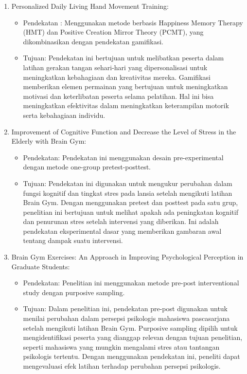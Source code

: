 \documentclass[12pt,a4paper]{article}
\begin{document}
\begin{enumerate}
    \item Personalized Daily Living Hand Movement Training:
    \begin{itemize}
        \item Pendekatan : Menggunakan metode berbasis Happiness Memory Therapy (HMT) dan Positive Creation Mirror Theory (PCMT), yang dikombinasikan dengan pendekatan gamifikasi.

        \item Tujuan: Pendekatan ini bertujuan untuk melibatkan peserta dalam latihan gerakan tangan sehari-hari yang dipersonalisasi untuk meningkatkan kebahagiaan dan kreativitas mereka. Gamifikasi memberikan elemen permainan yang bertujuan untuk meningkatkan motivasi dan keterlibatan peserta selama pelatihan. Hal ini bisa meningkatkan efektivitas dalam meningkatkan keterampilan motorik serta kebahagiaan individu.
    \end{itemize}

    \item Improvement of Cognitive Function and Decrease the Level of Stress in the Elderly with Brain Gym:
    \begin{itemize}
        \item Pendekatan: Pendekatan ini menggunakan desain pre-experimental dengan metode one-group pretest-posttest.
        \item Tujuan: Pendekatan ini digunakan untuk mengukur perubahan dalam fungsi kognitif dan tingkat stres pada lansia setelah mengikuti latihan Brain Gym. Dengan menggunakan pretest dan posttest pada satu grup, penelitian ini bertujuan untuk melihat apakah ada peningkatan kognitif dan penurunan stres setelah intervensi yang diberikan. Ini adalah pendekatan eksperimental dasar yang memberikan gambaran awal tentang dampak suatu intervensi.
    \end{itemize}

    \newpage

    \item Brain Gym Exercises: An Approach in Improving Psychological Perception in Graduate Students:

    \begin{itemize}
        \item Pendekatan: Penelitian ini menggunakan metode pre-post interventional study dengan purposive sampling.
        \item Tujuan: Dalam penelitian ini, pendekatan pre-post digunakan untuk menilai perubahan dalam persepsi psikologis mahasiswa pascasarjana setelah mengikuti latihan Brain Gym. Purposive sampling dipilih untuk mengidentifikasi peserta yang dianggap relevan dengan tujuan penelitian, seperti mahasiswa yang mungkin mengalami stres atau tantangan psikologis tertentu. Dengan menggunakan pendekatan ini, peneliti dapat mengevaluasi efek latihan terhadap perubahan persepsi psikologis.
    \end{itemize}

\end{enumerate}
\end{document}
